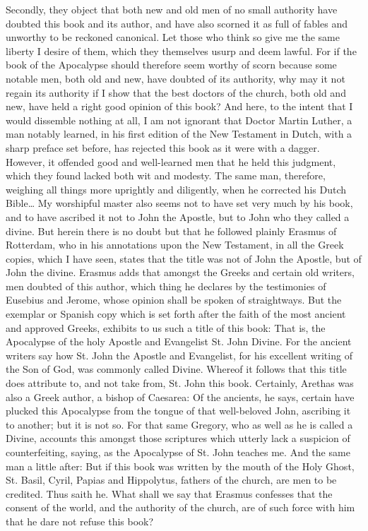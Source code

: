 Secondly, they object that both new and old men of no small authority have doubted this book and its author, and have also scorned it as full of fables and unworthy to be reckoned canonical. Let those who think so give me the same liberty I desire of them, which they themselves usurp and deem lawful. For if the book of the Apocalypse should therefore seem worthy of scorn because some notable men, both old and new, have doubted of its authority, why may it not regain its authority if I show that the best doctors of the church, both old and new, have held a right good opinion of this book? And here, to the intent that I would dissemble nothing at all, I am not ignorant that Doctor Martin Luther, a man notably learned, in his first edition of the New Testament in Dutch, with a sharp preface set before, has rejected this book as it were with a dagger. However, it offended good and well-learned men that he held this judgment, which they found lacked both wit and modesty. The same man, therefore, weighing all things more uprightly and diligently, when he corrected his Dutch Bible… My worshipful master also seems not to have set very much by his book, and to have ascribed it not to John the Apostle, but to John who they called a divine. But herein there is no doubt but that he followed plainly Erasmus of Rotterdam, who in his annotations upon the New Testament, in all the Greek copies, which I have seen, states that the title was not of John the Apostle, but of John the divine. Erasmus adds that amongst the Greeks and certain old writers, men doubted of this author, which thing he declares by the testimonies of Eusebius and Jerome, whose opinion shall be spoken of straightways. But the exemplar or Spanish copy which is set forth after the faith of the most ancient and approved Greeks, exhibits to us such a title of this book: That is, the Apocalypse of the holy Apostle and Evangelist St. John Divine. For the ancient writers say how St. John the Apostle and Evangelist, for his excellent writing of the Son of God, was commonly called Divine. Whereof it follows that this title does attribute to, and not take from, St. John this book. Certainly, Arethas was also a Greek author, a bishop of Caesarea: Of the ancients, he says, certain have plucked this Apocalypse from the tongue of that well-beloved John, ascribing it to another; but it is not so. For that same Gregory, who as well as he is called a Divine, accounts this amongst those scriptures which utterly lack a suspicion of counterfeiting, saying, as the Apocalypse of St. John teaches me. And the same man a little after: But if this book was written by the mouth of the Holy Ghost, St. Basil, Cyril, Papias and Hippolytus, fathers of the church, are men to be credited. Thus saith he. What shall we say that Erasmus confesses that the consent of the world, and the authority of the church, are of such force with him that he dare not refuse this book?

